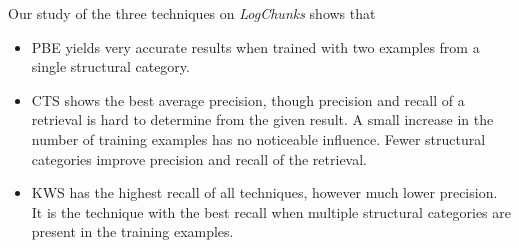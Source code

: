 
Our study of the three techniques on \emph{LogChunks} shows that
\begin{itemize}
  \item PBE yields very accurate results when trained with two examples from a
  single structural category.
  \item CTS shows the best average precision, though precision and recall of a
  retrieval is hard to determine from the given result.
  A small increase in the number of training examples has no noticeable influence.
  Fewer structural categories improve precision and recall of the retrieval.
  \item KWS has the highest recall of all techniques, however much lower precision.
  It is the technique with the best recall when multiple structural categories
  are present in the training examples.
\end{itemize}


